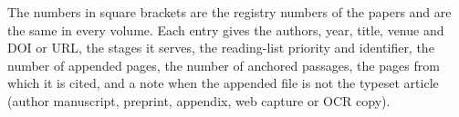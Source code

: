 The numbers in square brackets are the registry numbers of the papers and are the same in every volume. Each entry gives the authors, year, title, venue and DOI or URL, the stages it serves, the reading-list priority and identifier, the number of appended pages, the number of anchored passages, the pages from which it is cited, and a note when the appended file is not the typeset article (author manuscript, preprint, appendix, web capture or OCR copy).
